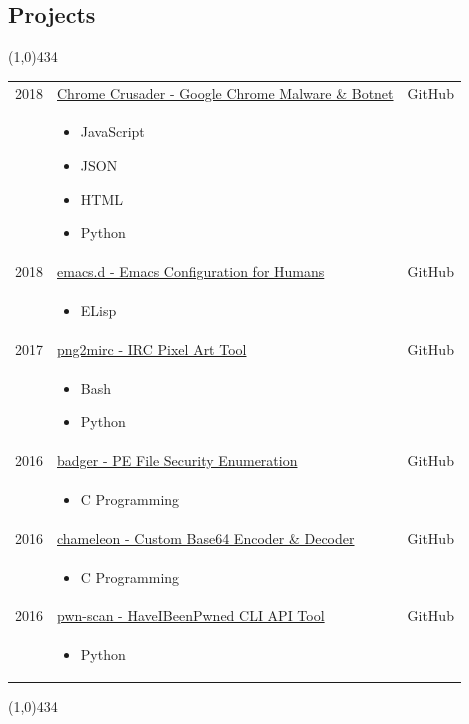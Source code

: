 \documentclass{res}
\newcommand{\frstCVcell}{2.5cm}
\begin{document}
\begin{resume}
  \pagebreak
  \section{Projects}
  \line(1,0){434}
  \newline
  \newline
  \begin{tabularx}{\textwidth}{p{\frstCVcell}Xc}
    2018 & \href{https://github.com/lillypad/chrome-crusader}{Chrome Crusader - Google Chrome Malware \& Botnet} & GitHub\\
    &
    \begin{itemize}
    \item JavaScript
    \item JSON
    \item HTML
    \item Python
    \end{itemize}
    & \\
    2018 & \href{https://github.com/lillypad/emacs.d}{emacs.d - Emacs Configuration for Humans} & GitHub\\
    &
    \begin{itemize}
    \item ELisp
    \end{itemize}
    & \\
    2017 & \href{https://github.com/lillypad/png2mirc}{png2mirc - IRC Pixel Art Tool} & GitHub\\
    &
    \begin{itemize}
    \item Bash
    \item Python
    \end{itemize}
    & \\
    2016 & \href{https://github.com/lillypad/badger}{badger - PE File Security Enumeration} & GitHub\\
    &
    \begin{itemize}
    \item C Programming
    \end{itemize}
    & \\
    2016 & \href{https://github.com/lillypad/chameleon}{chameleon - Custom Base64 Encoder \& Decoder} & GitHub\\
    &
    \begin{itemize}
    \item C Programming
    \end{itemize}
    & \\
    2016 & \href{https://github.com/lillypad/pwn-scan}{pwn-scan - HaveIBeenPwned CLI API Tool} & GitHub\\
    &
    \begin{itemize}
    \item Python
    \end{itemize}
    & \\
    \end{tabularx}
  \newline
  \line(1,0){434}


\end{resume}
\end{document}
